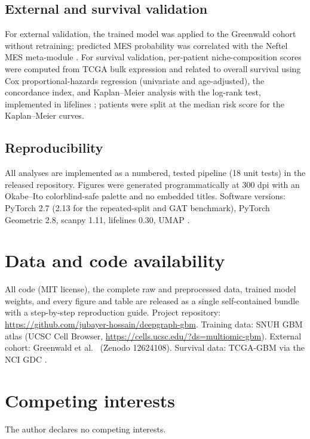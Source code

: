 \documentclass[11pt,letterpaper]{article}
\begin{document}
\subsection{External and survival validation}

For external validation, the trained model was applied to the Greenwald cohort without retraining; predicted MES probability was correlated with the Neftel MES meta-module \cite{neftel2019}. For survival validation, per-patient niche-composition scores were computed from TCGA bulk expression and related to overall survival using Cox proportional-hazards regression (univariate and age-adjusted), the concordance index, and Kaplan--Meier analysis with the log-rank test, implemented in lifelines \cite{davidsonpilon2019}; patients were split at the median risk score for the Kaplan--Meier curves.

\subsection{Reproducibility}

All analyses are implemented as a numbered, tested pipeline (18 unit tests) in the released repository. Figures were generated programmatically at 300 dpi with an Okabe--Ito colorblind-safe palette and no embedded titles. Software versions: PyTorch 2.7 (2.13 for the repeated-split and GAT benchmark), PyTorch Geometric 2.8, scanpy 1.11, lifelines 0.30, UMAP \cite{mcinnes2018}.

\section*{Data and code availability}
All code (MIT license), the complete raw and preprocessed data, trained model weights, and every figure and table are released as a single self-contained bundle with a step-by-step reproduction guide. Project repository: \url{https://github.com/jubayer-hossain/deepgraph-gbm}. Training data: SNUH GBM atlas \cite{park2026} (UCSC Cell Browser, \url{https://cells.ucsc.edu/?ds=multiomic-gbm}). External cohort: Greenwald et al.\ \cite{greenwald2024} (Zenodo 12624108). Survival data: TCGA-GBM via the NCI GDC \cite{tcga2008}.

\section*{Competing interests}
The author declares no competing interests.
\end{document}
